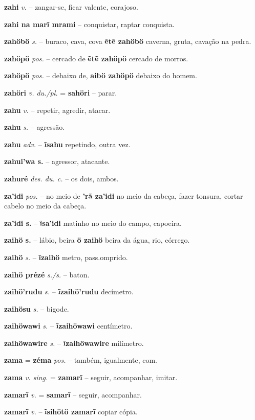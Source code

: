 \textbf{zahi} \textit{v.} -- zangar-se, ficar valente, corajoso.

\textbf{zahi na marĩ mrami} -- conquistar, raptar  conquista.

\textbf{zahöbö} \textit{s.} -- buraco, cava, cova  \textbf{ẽtẽ zahöbö} caverna, gruta, cavação na pedra.

\textbf{zahöpö} \textit{pos.} -- cercado de  \textbf{ẽtẽ zahöpö} cercado de morros.

\textbf{zahöpö} \textit{pos.} -- debaixo de, \textbf{aibö zahöpö} debaixo do homem.

\textbf{zahöri} \textit{v. du./pl.} = \textbf{sahöri} -- parar.

\textbf{zahu} \textit{v.} -- repetir, agredir, atacar.

\textbf{zahu} \textit{s.} -- agressão.

\textbf{zahu} \textit{adv.} -- \textbf{ĩsahu} repetindo, outra vez.

\textbf{zahui'wa s.} -- agressor, atacante.

\textbf{zahuré} \textit{des. du. c.} -- os dois, ambos.

\textbf{za'idi} \textit{pos.} -- no meio de  \textbf{'rã za'idi} no meio da cabeça, fazer tonsura, cortar cabelo no meio da cabeça.

\textbf{za'idi s.} -- \textbf{ĩsa'idi} matinho no meio do campo, capoeira.

\textbf{zaihö s.} -- lábio, beira  \textbf{ö zaihö} beira da água, rio, córrego.

\textbf{zaihö} \textit{s.} -- \textbf{ĩzaihö} metro, pass.omprido.

\textbf{zaihö prézé} \textit{s./s.} -- baton.

\textbf{zaihö'rudu} \textit{s.} -- \textbf{ĩzaihö'rudu} decímetro.

\textbf{zaihösu} \textit{s.} -- bigode.

\textbf{zaihöwawi} \textit{s.} -- \textbf{ĩzaihöwawi} centímetro.

\textbf{zaihöwawire} \textit{s.} -- \textbf{ĩzaihöwawire} milímetro.

\textbf{zama} = \textbf{zéma} \textit{pos.} -- também, igualmente, com.

\textbf{zama} \textit{v. sing.} = \textbf{zamarĩ} -- seguir, acompanhar, imitar.

\textbf{zamarĩ} \textit{v.} = \textbf{samarĩ} -- seguir, acompanhar.

\textbf{zamarĩ} \textit{v.} -- \textbf{ĩsihötö zamarĩ} copiar  cópia.

